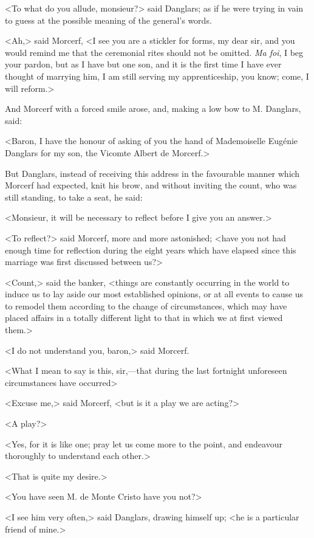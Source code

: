  <To what do you allude, monsieur?> said Danglars; as if he were trying in vain to guess at the possible meaning of the general's words. 

 <Ah,> said Morcerf, <I see you are a stickler for forms, my dear sir, and you would remind me that the ceremonial rites should not be omitted. \textit{Ma foi}, I beg your pardon, but as I have but one son, and it is the first time I have ever thought of marrying him, I am still serving my apprenticeship, you know; come, I will reform.> 

 And Morcerf with a forced smile arose, and, making a low bow to M. Danglars, said: 

 <Baron, I have the honour of asking of you the hand of Mademoiselle Eugénie Danglars for my son, the Vicomte Albert de Morcerf.> 

 But Danglars, instead of receiving this address in the favourable manner which Morcerf had expected, knit his brow, and without inviting the count, who was still standing, to take a seat, he said: 

 <Monsieur, it will be necessary to reflect before I give you an answer.> 

 <To reflect?> said Morcerf, more and more astonished; <have you not had enough time for reflection during the eight years which have elapsed since this marriage was first discussed between us?> 

 <Count,> said the banker, <things are constantly occurring in the world to induce us to lay aside our most established opinions, or at all events to cause us to remodel them according to the change of circumstances, which may have placed affairs in a totally different light to that in which we at first viewed them.> 

 <I do not understand you, baron,> said Morcerf. 

 <What I mean to say is this, sir,—that during the last fortnight unforeseen circumstances have occurred\longdash> 

 <Excuse me,> said Morcerf, <but is it a play we are acting?> 

 <A play?> 

 <Yes, for it is like one; pray let us come more to the point, and endeavour thoroughly to understand each other.> 

 <That is quite my desire.> 

 <You have seen M. de Monte Cristo have you not?> 

 <I see him very often,> said Danglars, drawing himself up; <he is a particular friend of mine.> 

